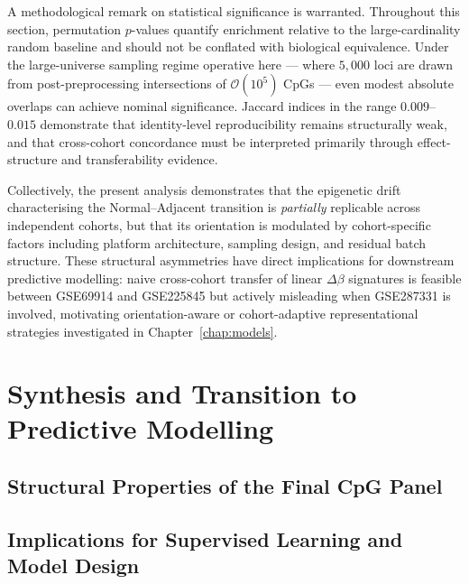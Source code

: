 A methodological remark on statistical significance is warranted.
Throughout this section, permutation $p$-values quantify enrichment
relative to the large-cardinality random baseline and should not be
conflated with biological equivalence.
Under the large-universe sampling regime operative here — where
$5{,}000$ loci are drawn from post-preprocessing intersections of
$\mathcal{O}(10^5)$ CpGs — even modest absolute overlaps can achieve
nominal significance.
Jaccard indices in the range $0.009$--$0.015$ demonstrate that
identity-level reproducibility remains structurally weak,
and that cross-cohort concordance must be interpreted primarily
through effect-structure and transferability evidence.

Collectively, the present analysis demonstrates that the epigenetic
drift characterising the Normal--Adjacent transition is \emph{partially}
replicable across independent cohorts, but that its orientation is
modulated by cohort-specific factors including platform architecture,
sampling design, and residual batch structure.
These structural asymmetries have direct implications for downstream
predictive modelling: naive cross-cohort transfer of linear
$\Delta\beta$ signatures is feasible between GSE69914 and GSE225845
but actively misleading when GSE287331 is involved, motivating
orientation-aware or cohort-adaptive representational strategies
investigated in Chapter~\ref{chap:models}.


\section{Synthesis and Transition to Predictive Modelling}
\label{sec:fs_conclusion}

\subsection{Structural Properties of the Final CpG Panel}
\label{subsec:fs_structural_summary}

\subsection{Implications for Supervised Learning and Model Design}
\label{subsec:fs_transition_ml}